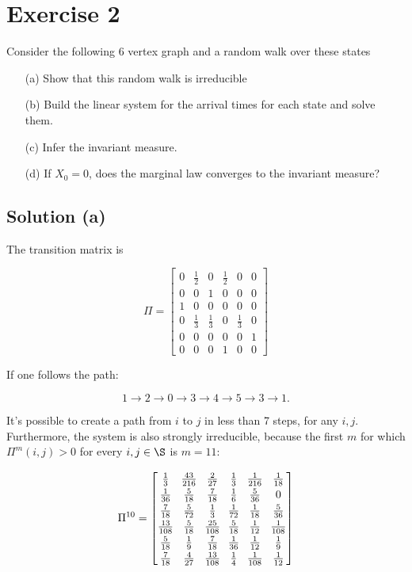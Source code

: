 \section*{Exercise 2}
Consider the following 6 vertex graph and a random walk over these states

\begin{figure}[H]
    \centering
    
\end{figure}

\begin{enumerate}
    \item[(a)] Show that this random walk is irreducible
    \item[(b)] Build the linear system for the arrival times for each state and solve them.
    \item[(c)] Infer the invariant measure.
    \item[(d)] If $X_0 = 0$, does the marginal law converges to the invariant measure?  
\end{enumerate}

\subsection*{Solution (a)}

The transition matrix is

\[ \Pi = \left[\begin{matrix}0 & \frac{1}{2} & 0 & \frac{1}{2} & 0 & 0\\0 & 0 & 1 & 0 & 0 & 0\\1 & 0 & 0 & 0 & 0 & 0\\0 & \frac{1}{3} & \frac{1}{3} & 0 & \frac{1}{3} & 0\\0 & 0 & 0 & 0 & 0 & 1\\0 & 0 & 0 & 1 & 0 & 0\end{matrix}\right]
\]

If one follows the path:

\[ 1\to 2\to 0 \to 3 \to 4 \to 5 \to 3 \to 1. \]

It's possible to create a path from $i$ to $j$ in less than 7 steps, for any $i,j$. Furthermore, the system is also strongly irreducible, because the first $m$ for which $\Pi^m(i,j) > 0$ for every $i,j\in\S$ is $m = 11$:

\[ \arraycolsep=3.4pt\def\arraystretch{1.2}
\Pi^{10} = \left[\begin{matrix}\frac{1}{3} & \frac{43}{216} & \frac{2}{27} & \frac{1}{3} & \frac{1}{216} & \frac{1}{18}\\\frac{1}{36} & \frac{5}{18} & \frac{7}{18} & \frac{1}{6} & \frac{5}{36} & 0\\\frac{7}{18} & \frac{5}{72} & \frac{1}{3} & \frac{1}{72} & \frac{1}{18} & \frac{5}{36}\\\frac{13}{108} & \frac{5}{18} & \frac{25}{108} & \frac{5}{18} & \frac{1}{12} & \frac{1}{108}\\\frac{5}{18} & \frac{1}{9} & \frac{7}{18} & \frac{1}{36} & \frac{1}{12} & \frac{1}{9}\\\frac{7}{18} & \frac{4}{27} & \frac{13}{108} & \frac{1}{4} & \frac{1}{108} & \frac{1}{12}\end{matrix}\right] \]

